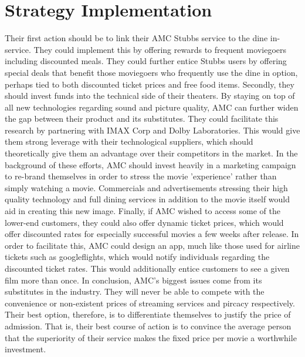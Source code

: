\documentclass[12pt]{article}
\begin{document}



\section{Strategy Implementation}
Their first action should be to link their AMC Stubbs service to the dine in-service. They could implement this by offering rewards to frequent moviegoers including discounted meals. They could further entice Stubbs users by offering special deals that benefit those moviegoers who frequently use the dine in option, perhaps tied to both discounted ticket prices and free food items. Secondly, they should invest funds into the technical side of their theaters. By staying on top of all new technologies regarding sound and picture quality, AMC can further widen the gap between their product and its substitutes. They could facilitate this research by partnering with IMAX Corp and Dolby Laboratories. This would give them strong leverage with their technological suppliers, which should theoretically give them an advantage over their competitors in the market. In the background of these efforts, AMC should invest heavily in a marketing campaign to re-brand themselves in order to stress the movie 'experience' rather than simply watching a movie. Commercials and advertisements stressing their high quality technology and full dining services in addition to the movie itself would aid in creating this new image. Finally, if AMC wished to access some of the lower-end customers, they could also offer dynamic ticket prices, which would offer discounted rates for especially successful movies a few weeks after release. In order to facilitate this, AMC could design an app, much like those used for airline tickets such as googleflights, which would notify individuals regarding the discounted ticket rates. This would additionally entice customers to see a given film more than once. In conclusion, AMC's biggest issues come from its substitutes in the industry. They will never be able to compete with the convenience or non-existent prices of streaming services and pircacy respectively. Their best option, therefore, is to differentiate themselves to justify the price of admission. That is, their best course of action is to convince the average person that the superiority of their service makes the fixed price per movie a worthwhile investment. 

\end{document}
